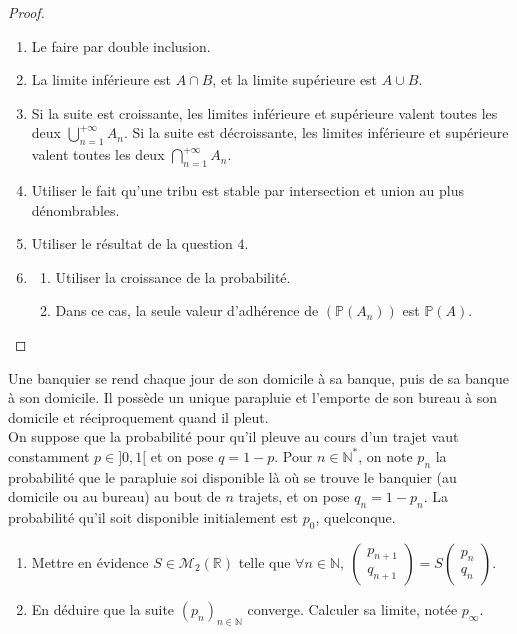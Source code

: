 \documentclass[french,a4paper]{article}
\renewcommand{\P}{\mathbb{P}}
\newcommand{\N}{\mathbb{N}}
\newcommand{\R}{\mathbb{R}}
\newcommand{\st}{^*}
\theoremstyle{plain}
\theoremstyle{definition}
\theoremstyle{remark}
\begin{document}
\begin{proof}
	\begin{enumerate}
		\item Le faire par double inclusion.
		\item La limite inférieure est $A\cap B$, et la limite supérieure est $A\cup B$.
		\item Si la suite est croissante, les limites inférieure et supérieure valent toutes les deux $\displaystyle\bigcup_{n=1}^{+\infty}A_n$. Si la suite est décroissante, les limites inférieure et supérieure valent toutes les deux $\displaystyle\bigcap_{n=1}^{+\infty}A_n$.
		\item Utiliser le fait qu'une tribu est stable par intersection et union au plus dénombrables.
		\item Utiliser le résultat de la question $4$.
		\item \begin{enumerate}[label=\alph*.]
			\item Utiliser la croissance de la probabilité.
			\item Dans ce cas, la seule valeur d'adhérence de $(\P(A_n))$ est $\P(A)$.
		\end{enumerate}
	\end{enumerate}
\end{proof}

\begin{ex}[Moulin.32]{}
	Une banquier se rend chaque jour de son domicile à sa banque, puis de sa banque à son domicile. Il possède un unique parapluie et l'emporte de son bureau à son domicile et réciproquement quand il pleut. \\ On suppose que la probabilité pour qu'il pleuve au cours d'un trajet vaut constamment $p\in]0,1[$ et on pose $q=1-p$. Pour $n\in\N\st$, on note $p_n$ la probabilité que le parapluie soi disponible là où se trouve le banquier (au domicile ou au bureau) au bout de $n$ trajets, et on pose $q_n=1-p_n$. La probabilité qu'il soit disponible initialement est $p_0$, quelconque.
	\begin{enumerate}
		\item Mettre en évidence $S\in\mathcal{M}_2(\R)$ telle que $\forall n\in\N,\ \displaystyle\begin{pmatrix}
			p_{n+1}\\ q_{n+1}
		\end{pmatrix}=S\begin{pmatrix}
		p_n\\ q_n
		\end{pmatrix}$.
		\item En déduire que la suite $(p_n)_{n\in\N}$ converge. Calculer sa limite, notée $p_\infty$.
	\end{enumerate}
\end{ex}
\end{document}
